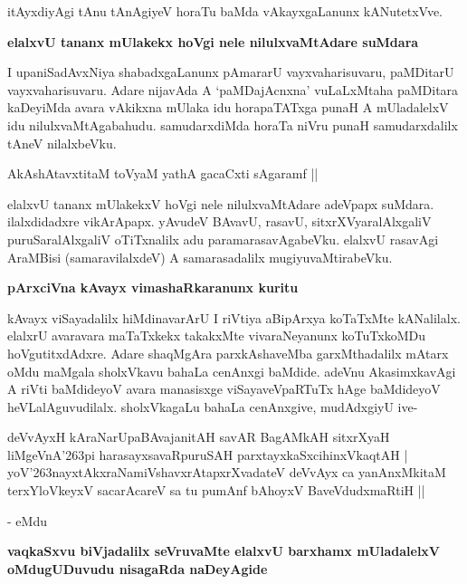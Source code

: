 \noindent
itAyxdiyAgi tAnu tAnAgiyeV horaTu baMda vAkayxgaLanunx kANutetxVve.

{\bigskip
\noindent
{\large\bf elalxvU tananx mUlakekx hoVgi nele nilulxvaMtAdare suMdara}}\label{page246}
\medskip

\noindent
I upaniSadAvxNiya shabadxgaLanunx pAmararU vayxvaharisuvaru, paMDitarU vayxvaharisuvaru. Adare nijavAda A `paMDajAcnxna' vuLaLxMtaha paMDitara kaDeyiMda avara vAkikxna mUlaka idu horapaTATxga punaH A mUladalelxV idu nilulxvaMtAgabahudu. samudarxdiMda horaTa niVru punaH samudarxdalilx tAneV nilalxbeVku.

\begin{shloka}
AkAshAtavxtitaM toVyaM yathA gacaCxti sAgaramf ||\label{247}
\end{shloka}

elalxvU tananx mUlakekxV hoVgi nele nilulxvaMtAdare adeVpapx suMdara. ilalxdidadxre vikArApapx. yAvu\-deV BAvavU, rasavU, sitxrXVyaralAlxgaliV puruSaralAlxgaliV oTiTxnalilx adu paramarasavAgabeVku. elalxvU rasa\-vAgi AraMBisi (samaravilalxdeV) A samarasadalilx mugiyuvaMtirabeVku.

{\medskip
\noindent
{\large\bf pArxciVna kAvayx vimashaRkaranunx kuritu}}
\smallskip

\noindent
kAvayx viSayadalilx hiMdinavarArU I riVtiya aBipArxya koTaTxMte kANalilalx. elalxrU avaravara maTaTxkekx takakxMte vivaraNeyanunx koTuTxkoMDu hoVgutitxdAdxre. Adare shaqMgAra parxkAshaveMba garxMthadalilx mAtarx oMdu maMgala sholxVkavu bahaLa cenAnxgi baMdide. adeVnu AkasimxkavAgi A riVti baMdideyoV avara manasisxge viSayaveVpaRTuTx hAge baMdideyoV heVLalAguvudilalx. sholxVkagaLu bahaLa cenAnxgive, mudAdxgiyU ive-

\begin{shloka}
deVvAyxH kAraNarUpaBAvajanitAH savAR BagAMkAH sitxrXyaH\\\label{247}
liMgeVnA\char'263pi harasayxsavaRpuruSAH parxtayxkaSxcihinxVkaqtAH |\\
yoV\char'263nayxtAkxraNamiVshavxrAtapxrXvadateV deVvAyx ca yanAnxMkitaM \\
terxYloVkeyxV sacarAcareV sa tu pumAnf bAhoyxV BaveVdudxmaRtiH || 
\end{shloka}
\noindent
- eMdu

{\bigskip
\noindent
{\large\bf vaqkaSxvu biVjadalilx seVruvaMte elalxvU barxhamx mUladalelxV oMdugUDuvudu nisagaRda naDeyAgide}}\label{page247}
\medskip

